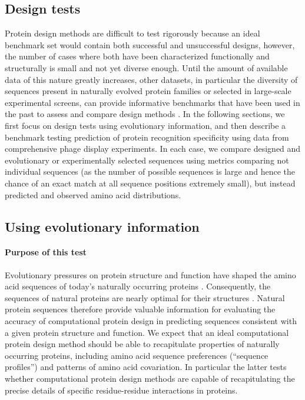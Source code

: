 \subsection{Design tests}

Protein design methods are difficult to test rigorously because an ideal benchmark set would contain both successful and unsuccessful designs, however, the number of cases where both have been characterized functionally and structurally is small and not yet diverse enough. Until the amount of available data of this nature greatly increases, other datasets, in particular the diversity of sequences present in naturally evolved protein families or selected in large-scale experimental screens, can provide informative benchmarks that have been used in the past to assess and compare design methods
\cite{ollikainen_computational_2013,ollikainen_chapter_2013}. In the following sections, we first focus on design tests using evolutionary information, and then describe a benchmark testing prediction of protein recognition specificity using data from comprehensive phage display experiments. In each case, we compare designed and evolutionary or experimentally selected sequences using metrics comparing not individual sequences (as the number of possible sequences is large and hence the chance of an exact match at all sequence positions extremely small), but instead predicted and observed amino acid distributions.

\subsection{Using evolutionary information}

\paragraph{Purpose of this test}

Evolutionary pressures on protein structure and function have shaped the amino acid sequences of today's naturally occurring proteins \cite{dokholyan_understanding_2001}. Consequently, the sequences of natural proteins are nearly optimal for their structures \cite{kuhlman_native_2000}. Natural protein sequences therefore provide valuable information for evaluating the accuracy of computational protein design in predicting sequences consistent with a given protein structure and function. We expect that an ideal computational protein design method should be able to recapitulate properties of naturally occurring proteins, including amino acid sequence preferences (``sequence profiles'') and patterns of amino acid covariation. In particular the latter tests whether computational protein design methods are capable of recapitulating the precise details of specific residue-residue interactions in proteins.

